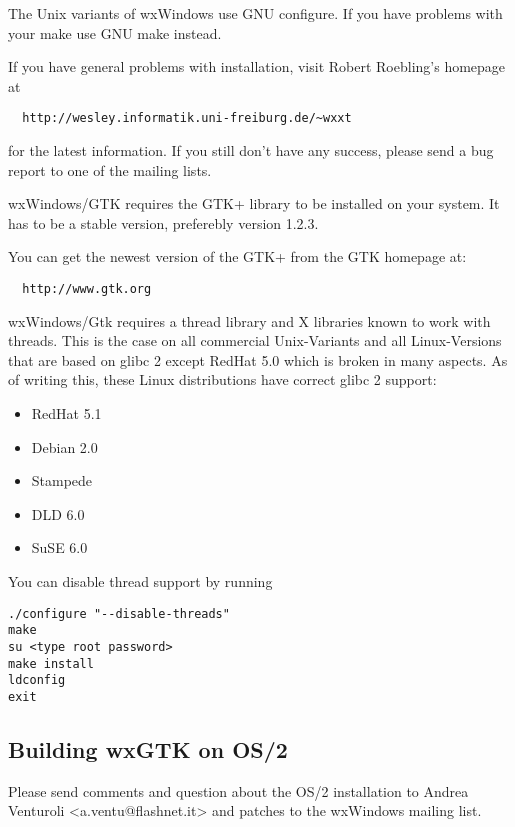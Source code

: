 
The Unix variants of wxWindows use GNU configure. If you have problems with your 
make use GNU make instead.

If you have general problems with installation, visit Robert Roebling's homepage at 

\begin{verbatim}
  http://wesley.informatik.uni-freiburg.de/~wxxt
\end{verbatim}
  
for the latest information. If you still don't have any success, please send a bug 
report to one of the mailing lists.


wxWindows/GTK requires the GTK+ library to be installed on your system. It has to 
be a stable version, preferebly version 1.2.3.

You can get the newest version of the GTK+ from the GTK homepage at:

\begin{verbatim}
  http://www.gtk.org
\end{verbatim}
  
wxWindows/Gtk requires a thread library and X libraries known to work with threads. 
This is the case on all commercial Unix-Variants and all Linux-Versions that are 
based on glibc 2 except RedHat 5.0 which is broken in many aspects. As of writing 
this, these Linux distributions have correct glibc 2 support:

\begin{itemize}\itemsep=0pt
\item RedHat 5.1
\item Debian 2.0
\item Stampede
\item DLD 6.0
\item SuSE 6.0
\end{itemize}
 
You can disable thread support by running 

\begin{verbatim}
./configure "--disable-threads"
make
su <type root password>
make install
ldconfig
exit
\end{verbatim}
  
\subsection{Building wxGTK on OS/2}

Please send comments and question about the OS/2 installation
to Andrea Venturoli <a.ventu@flashnet.it> and patches to
the wxWindows mailing list.

